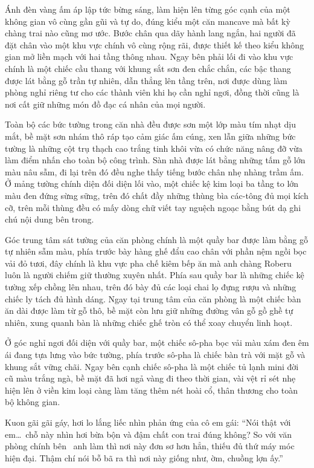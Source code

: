 \documentclass[../main.tex]{subfiles}
\begin{document}
Ánh đèn vàng ấm áp lập tức bừng sáng, làm hiện lên từng góc cạnh của một không gian vô cùng gần gũi và tự do, đúng kiểu một căn mancave mà bất kỳ chàng trai nào cũng mơ ước. Bước chân qua dãy hành lang ngắn, hai người đã đặt chân vào một khu vực chính vô cùng rộng rãi, được thiết kế theo kiểu không gian mở liền mạch với hai tầng thông nhau. Ngay bên phải lối đi vào khu vực chính là một chiếc cầu thang với khung sắt sơn đen chắc chắn, các bậc thang được lát bằng gỗ trần tự nhiên, dẫn thẳng lên tầng trên, nơi được dùng làm phòng nghỉ riêng tư cho các thành viên khi họ cần nghỉ ngơi, đồng thời cũng là nơi cất giữ những món đồ đạc cá nhân của mọi người.

Toàn bộ các bức tường trong căn nhà đều được sơn một lớp màu tím nhạt dịu mắt, bề mặt sơn nhám thô ráp tạo cảm giác ấm cúng, xen lẫn giữa những bức tường là những cột trụ thạch cao trắng tinh khôi vừa có chức năng nâng đỡ vừa làm điểm nhấn cho toàn bộ công trình. Sàn nhà được lát bằng những tấm gỗ lớn màu nâu sẫm, đi lại trên đó đều nghe thấy tiếng bước chân nhẹ nhàng trầm ấm. Ở mảng tường chính diện đối diện lối vào, một chiếc kệ kim loại ba tầng to lớn màu đen đứng sừng sững, trên đó chất đầy những thùng bìa các-tông đủ mọi kích cỡ, trên mỗi thùng đều có mấy dòng chữ viết tay nguệch ngoạc bằng bút dạ ghi chú nội dung bên trong.

Góc trung tâm sát tường của căn phòng chính là một quầy bar được làm bằng gỗ tự nhiên sẫm màu, phía trước bày hàng ghế đẩu cao chân với phần nệm ngồi bọc vải đỏ tươi, đây chính là khu vực pha chế kiêm bếp ăn mà anh chàng Roberu luôn là người chiếm giữ thường xuyên nhất. Phía sau quầy bar là những chiếc kệ tường xếp chồng lên nhau, trên đó bày đủ các loại chai lọ đựng rượu và những chiếc ly tách đủ hình dáng. Ngay tại trung tâm của căn phòng là một chiếc bàn ăn dài được làm từ gỗ thô, bề mặt còn lưu giữ những đường vân gỗ gồ ghề tự nhiên, xung quanh bàn là những chiếc ghế tròn có thể xoay chuyển linh hoạt.

Ở góc nghỉ ngơi đối diện với quầy bar, một chiếc sô-pha bọc vải màu xám đen êm ái đang tựa lưng vào bức tường, phía trước sô-pha là chiếc bàn trà với mặt gỗ và khung sắt vững chãi. Ngay bên cạnh chiếc sô-pha là một chiếc tủ lạnh mini đời cũ màu trắng ngà, bề mặt đã hơi ngả vàng đi theo thời gian, vài vệt rỉ sét nhẹ hiện lên ở viền kim loại càng làm tăng thêm nét hoài cổ, thân thương cho toàn bộ không gian.

Kuon gãi gãi gáy, hơi lo lắng liếc nhìn phản ứng của cô em gái: ``Nói thật với em\dots\ chỗ này nhìn hơi bừa bộn và đậm chất con trai đúng không? So với văn phòng chính bên \hll\ anh làm thì nơi này đơn sơ hơn hẳn, thiếu đủ thứ máy móc hiện đại. Thậm chí nói bỗ bã ra thì nơi này giống như, ờm, chuồng lợn ấy.''
\end{document}
